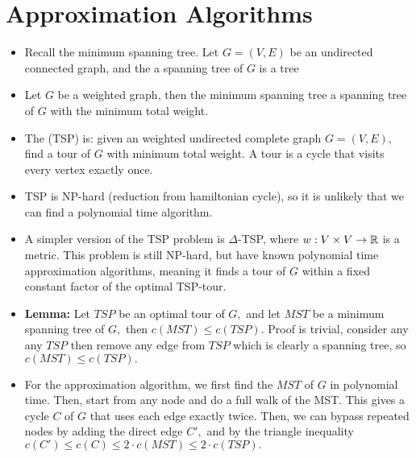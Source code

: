 \documentclass[a4paper,12pt]{article}
\begin{document}
\section{Approximation Algorithms}
\begin{itemize}
    \item Recall the minimum spanning tree. Let $G=(V,E)$ be an undirected connected graph, and the a spanning tree of $G$ is a tree
    \item Let $G$ be a weighted graph, then the minimum spanning tree a spanning tree of $G$ with the minimum total weight.
    \item The (TSP) is: given an weighted undirected complete graph $G=(V,E),$ find a tour of $G$ with minimum total weight. A tour is a cycle that visits every vertex exactly once.
    \item TSP is NP-hard (reduction from hamiltonian cycle), so it is unlikely that we can find a polynomial time algorithm.
    \item A simpler version of the TSP problem is $\Delta$-TSP, where $w:V\times V\to\mathbb{R}$ is a metric. This problem is still NP-hard, but have known polynomial time approximation algorithms, meaning it finds a tour of $G$ within a fixed constant factor of the optimal TSP-tour.
    \item \textbf{Lemma:} Let $TSP$ be an optimal tour of $G,$ and let $MST$ be a minimum spanning tree of $G,$ then $c(MST)\leq c(TSP).$ Proof is trivial, consider any any $TSP$ then remove any edge from $TSP$ which is clearly a spanning tree, so $c(MST)\leq c(TSP).$
    \item For the approximation algorithm, we first find the $MST$ of $G$ in polynomial time. Then, start from any node and do a full walk of the MST. This gives a cycle $C$ of $G$ that uses each edge exactly twice. Then, we can bypass repeated nodes by adding the direct edge $C',$ and by the triangle inequality $c(C')\leq c(C)\leq 2\cdot c(MST)\leq 2\cdot c(TSP).$
\end{itemize}
\end{document}
